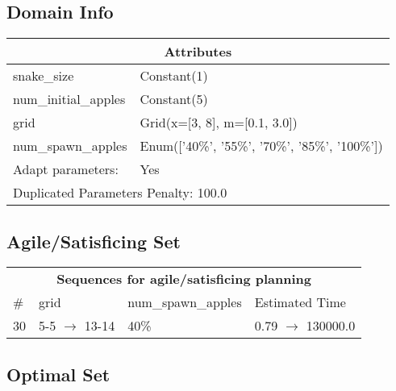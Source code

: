 \documentclass{article}
\begin{document}
                    \subsection*{Domain Info}

                    \begin{center}
                    \begin{tabular}{p{}p{}}
                    \multicolumn{2}{c}{\bf \large Attributes}\\\midrule
                    snake\_size & Constant(1)\\
num\_initial\_apples & Constant(5)\\
grid & Grid(x=[3, 8], m=[0.1, 3.0])\\
num\_spawn\_apples & Enum(['40\%', '55\%', '70\%', '85\%', '100\%'])
                    
                    \\\midrule
                    Adapt parameters: & Yes
                
                     \\\midrule
                    \multicolumn{2}{l}{Duplicated Parameters Penalty: 100.0}
                    \end{tabular}
                    \end{center}
                
                         \subsection*{Agile/Satisficing Set}

                        \begin{center}
                        \begin{tabular}{l|l|l|l}
                        \multicolumn{4}{c}{\bf \large Sequences for agile/satisficing planning}\\
                        \# & grid & num\_spawn\_apples & Estimated Time\\\midrule
                        30&5-5 $\rightarrow$ 13-14&40\%&0.79 $\rightarrow$ 130000.0
                        \end{tabular}
                        \end{center}
                    
                            \subsection*{Optimal Set}
\end{document}
